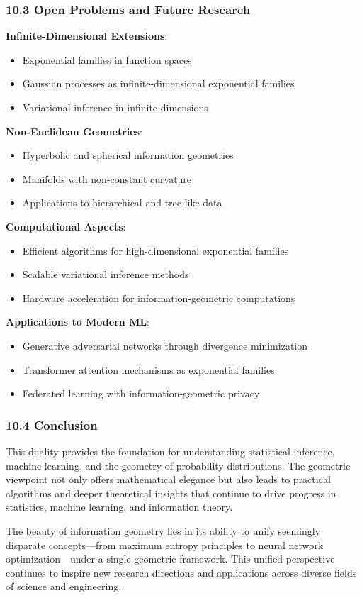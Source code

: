 \documentclass{amsart}
\theoremstyle{plain}
\theoremstyle{definition}
\theoremstyle{remark}
\begin{document}
\subsubsection{10.3 Open Problems and Future Research}

\textbf{Infinite-Dimensional Extensions}:

\begin{itemize}
	\item Exponential families in function spaces
	\item Gaussian processes as infinite-dimensional exponential families
	\item Variational inference in infinite dimensions
\end{itemize}

\textbf{Non-Euclidean Geometries}:

\begin{itemize}
	\item Hyperbolic and spherical information geometries
	\item Manifolds with non-constant curvature
	\item Applications to hierarchical and tree-like data
\end{itemize}

\textbf{Computational Aspects}:

\begin{itemize}
	\item Efficient algorithms for high-dimensional exponential families
	\item Scalable variational inference methods
	\item Hardware acceleration for information-geometric computations
\end{itemize}

\textbf{Applications to Modern ML}:

\begin{itemize}
	\item Generative adversarial networks through divergence minimization
	\item Transformer attention mechanisms as exponential families
	\item Federated learning with information-geometric privacy
\end{itemize}

\subsubsection{10.4 Conclusion}

This duality provides the foundation for understanding statistical inference, machine learning, and the geometry of probability distributions. The geometric viewpoint not only offers mathematical elegance but also leads to practical algorithms and deeper theoretical insights that continue to drive progress in statistics, machine learning, and information theory.

The beauty of information geometry lies in its ability to unify seemingly disparate concepts—from maximum entropy principles to neural network optimization—under a single geometric framework. This unified perspective continues to inspire new research directions and applications across diverse fields of science and engineering.
\end{document}
